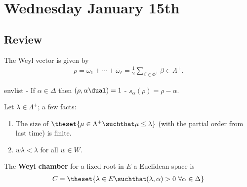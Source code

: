\hypertarget{wednesday-january-15th}{%
\section{Wednesday January 15th}\label{wednesday-january-15th}}

\hypertarget{review}{%
\subsection{Review}\label{review}}

\begin{definition}

The Weyl vector is given by
\begin{align*}
\rho = \bar \omega_1 + \cdots + \bar \omega_\ell = \frac 1 2 \sum_{\beta \in \Phi^+} \beta \in \Lambda^+
.\end{align*}

\end{definition}

\begin{proposition}

envlist - If \(\alpha \in \Delta\) then \((\rho, \alpha\dual) = 1\) -
\(s_\alpha(\rho) = \rho - \alpha\).

\end{proposition}

\begin{fact}

Let \(\lambda \in \Lambda^+\); a few facts:

\begin{enumerate}
\def\labelenumi{\arabic{enumi}.}
\tightlist
\item
  The size of \(\theset{\mu\in \Lambda^+ \suchthat \mu \leq \lambda}\)
  (with the partial order from last time) is finite.
\item
  \(w\lambda < \lambda\) for all \(w\in W\).
\end{enumerate}

\end{fact}

\begin{definition}

The \textbf{Weyl chamber} for a fixed root in \(E\) a Euclidean space is
\begin{align*}
C = \theset{\lambda \in E \suchthat (\lambda, \alpha) > 0 ~ \forall \alpha\in\Delta}
\end{align*}

\end{definition}

